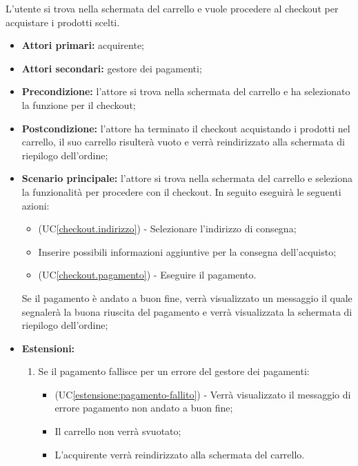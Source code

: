 
\label{checkout}


L'utente si trova nella schermata del carrello e vuole procedere al checkout per acquistare i prodotti scelti.
\begin{itemize}
    \item \textbf{Attori primari:} acquirente;
    \item \textbf{Attori secondari:} gestore dei pagamenti;
    \item \textbf{Precondizione:} l'attore si trova nella schermata del carrello e ha selezionato la funzione per il checkout;
    \item \textbf{Postcondizione:} l'attore ha terminato il checkout acquistando i prodotti nel carrello, il suo carrello risulterà vuoto e verrà reindirizzato alla schermata di riepilogo dell'ordine;
    \item \textbf{Scenario principale:} l'attore si trova nella schermata del carrello e seleziona la funzionalità per procedere con il checkout. In seguito eseguirà le seguenti azioni:
    \begin{itemize}
    	\item (UC\ref{checkout.indirizzo}) - Selezionare l'indirizzo di consegna;
    	\item Inserire possibili informazioni aggiuntive per la consegna dell'acquisto;
        \item (UC\ref{checkout.pagamento}) - Eseguire il pagamento.
    \end{itemize}
    Se il pagamento è andato a buon fine, verrà visualizzato un messaggio il quale segnalerà la buona riuscita del pagamento e verrà visualizzata la schermata di riepilogo dell'ordine;
    \item \textbf{Estensioni:}
    \begin{enumerate}[label=\lett]
        \item Se il pagamento fallisce per un errore del gestore dei pagamenti:
        \begin{itemize}
            \item (UC\ref{estensione:pagamento-fallito}) - Verrà visualizzato il messaggio di errore pagamento non andato a buon fine;
            \item Il carrello non verrà svuotato;
            \item L'acquirente verrà reindirizzato alla schermata del carrello.
        \end{itemize}
    \end{enumerate}
\end{itemize}


